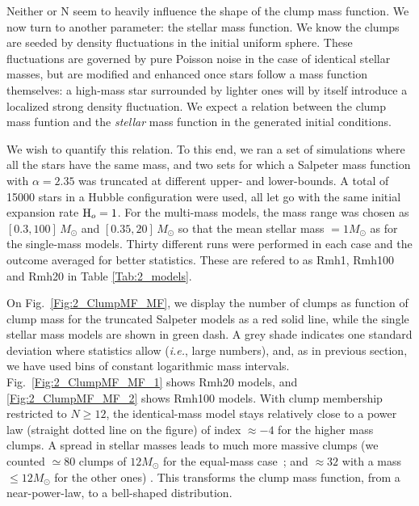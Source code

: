 Neither \tHub or N seem to heavily influence the shape of the clump mass function. We now turn to another parameter: the stellar mass function. We know the clumps are seeded by density fluctuations in the initial uniform sphere. These fluctuations are governed by pure Poisson noise in the case of identical stellar masses, but are modified and enhanced once stars follow a mass function themselves: a high-mass star surrounded by lighter ones will by itself introduce a localized strong density fluctuation. We expect a relation between the clump mass funtion and  the {\it stellar} mass function in the generated initial conditions.

We wish to quantify this relation. To this end, we ran a set of simulations where all the stars have the same mass, and two sets for which a Salpeter mass function with $\alpha = 2.35$  was truncated at different upper- and lower-bounds. A total of 15000 stars in a Hubble configuration were used, all let go  with the same initial expansion rate  ${\textrm{H}}_o = 1$. For the multi-mass models, the mass range  was chosen as $[0.3, 100]\, M_\odot$ and $[0.35, 20]\, M_\odot$ so that the mean stellar mass $= 1M_\odot$ as for the single-mass models. Thirty different runs were performed in each case and the outcome averaged for better statistics. These are refered to as Rmh1, Rmh100 and Rmh20 in Table \ref{Tab:2_models}.

On Fig.~\ref{Fig:2_ClumpMF_MF}, we display the  number of clumps as function of clump mass for the truncated Salpeter  models as a red solid line, while the single stellar mass models are shown in green dash. A grey shade indicates one standard deviation where statistics allow ({\it i.e.}, large numbers), and, as in previous section, we have used bins of constant logarithmic mass intervals.  Fig.~\ref{Fig:2_ClumpMF_MF_1} shows Rmh20 models, and \ref{Fig:2_ClumpMF_MF_2} shows Rmh100 models. 
With clump membership restricted to $N \geq 12$, the identical-mass model  stays relatively close to a power law (straight dotted line on the figure) of index $\approx -4$ for the higher mass clumps. A spread in stellar masses leads to much more massive clumps (we counted $\simeq80$ clumps of $12 M_\odot$ for the equal-mass case~; and $\approx 32$ with a mass $ \le 12 M_\odot$ for the other ones) . This transforms the clump mass function, from a near-power-law, to a bell-shaped distribution.  






